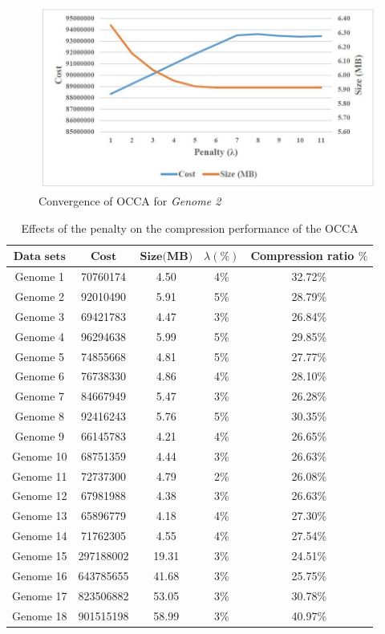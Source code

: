 \documentclass[preprint,12pt]{elsarticle}%
\begin{document}
\begin{figure}[h]
\begin{center}
\includegraphics[scale=0.45]{Images/drawing4_1.jpg}
\caption{Convergence of OCCA for \textit{Genome 2}}
\end{center}
\label{Fig5}
\end{figure}


\begin{table}[tpbh]
\small
\renewcommand{\arraystretch}{1.1}
\caption{Effects of  the penalty on the compression performance of the OCCA}
\centering
\begin{tabular}{c c c c c }
\toprule
$\textbf{Data sets}$ & $\textbf{Cost}$	& $\textbf{Size(MB)}$ &		\textbf{$\lambda (\%)$} &		\textbf{Compression ratio $\%$} \\\hline
Genome 1 &	 70760174 &4.50& 4\% & 32.72\%\\\hline
Genome 2 &	92010490& 5.91 & 5\%& 28.79\%\\\hline
Genome 3&	69421783& 4.47 &3\%& 26.84\%\\\hline
Genome 4&	96294638& 5.99 & 5\%& 29.85\%\\\hline
Genome 5&	74855668 &4.81& 5\%& 27.77\%\\\hline
Genome 6&	76738330& 4.86  &4\%& 28.10\%\\\hline
Genome 7&	84667949 &5.47& 3\%& 26.28\%\\\hline
Genome 8&	92416243 &5.76& 5\%& 30.35\%\\\hline
Genome 9&	66145783&4.21 & 4\%& 26.65\%\\\hline
Genome 10&	68751359& 4.44 &3\%& 26.63\%\\\hline
Genome 11&	72737300 &4.79& 2\%&26.08\%\\\hline
Genome 12&	67981988 & 4.38&3\%& 26.63\%\\\hline
Genome 13&	65896779& 4.18 &4\%& 27.30\%\\\hline
Genome 14&	71762305 &4.55 &4\%&27.54\% \\\hline
Genome 15&297188002 &19.31 & 3\%& 24.51\%\\\hline
Genome 16&643785655 & 41.68 & 3\%& 25.75\% \\\hline
Genome 17&823506882 & 53.05 & 3\%& 30.78\%\\\hline
Genome 18&901515198 &58.99 & 3\%& 40.97\%\\
\bottomrule
\end{tabular}
\label{table5}
\end{table}
\end{document}
